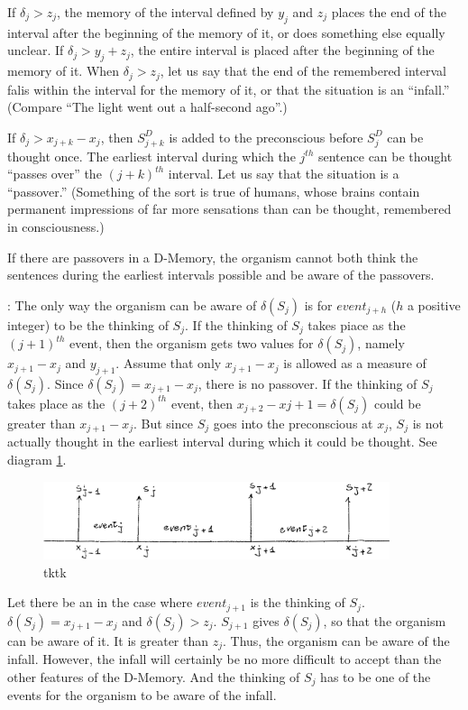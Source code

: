 \begin{hangers}
 If $\delta_j\greater z_j$, the memory of the interval defined by $y_j$ and 
$z_j$ places the end of the interval after the beginning of the memory of it, or 
does something else equally unclear. If $\delta_j\greater y_j+z_j$, the entire interval is placed 
after the beginning of the memory of it. When $\delta_j\greater z_j$, let us say that the end 
of the remembered interval falis within the interval for the memory of it, or 
that the situation is an \enquote{infall.} (Compare \enquote{The light went out a half-second 
ago}.)

 If $\delta_j\greater x_{j+k}-x_j$, then $S^D_{j+k}$ is added to the preconscious 
	before $S^D_j$ can be thought once. The earliest interval during which the $j^{th}$ 
	sentence can be thought \enquote{passes over} the $(j+k)^{th}$ interval. Let us say that 
the situation is a \enquote{passover.} (Something of the sort is true of humans, 
whose brains contain permanent impressions of far more sensations than can 
be thought, remembered in consciousness.) 

 If there are passovers in a D-Memory, the organism 
cannot both think the sentences during the earliest intervals possible and be 
aware of the passovers. 

\proof: The only way the organism can be aware of $\delta(S_j)$
is for $event_{j+h}$ ($h$ a positive integer) to be the thinking of $S_j$. 
If the thinking of $S_j$ takes piace as the $(j+1)^{th}$ event, then the organism gets two 
values for $\delta(S_j)$, namely $x_{j+1}-x_j$ and $y_{j+1}$. Assume that only $x_{j+1}-x_j$
is allowed as a measure of $\delta(S_j)$. Since $\delta(S_j)=x_{j+1}-x_j$, there is no passover. If 
the thinking of $S_j$ takes place as the $(j+2)^{th}$ event, then $x_{j+2}-x{j+1}=\delta(S_j)$
could be greater than $x_{j+1}-x_j$. But since $S_j$ goes into the preconscious at $x_j$, 
$S_j$ is not actually thought in the earliest interval during which it could be 
thought. See diagram \ref{dmemdiag}.

\begin{figure}
	\centering
	\includegraphics[width=4in]{img/dmemdiag}
	\caption{tktk}
	\label{dmemdiag}
\end{figure}

 Let there be an  in the case where $event_{j+1}$ is the 
thinking of $S_j$. $\delta(S_j)=x_{j+1}-x_j$ and $\delta(S_j)\greater z_j$. $S_{j+1}$ gives $\delta(S_j)$, 
so that the organism can be aware of it. 
It is greater than $z_j$. Thus, the organism can be 
aware of the infall. However, the infall will certainly be no more difficult to 
accept than the other features of the D-Memory. And the thinking of $S_j$ has 
to be one of the events for the organism to be aware of the infall. 
\end{hangers}

